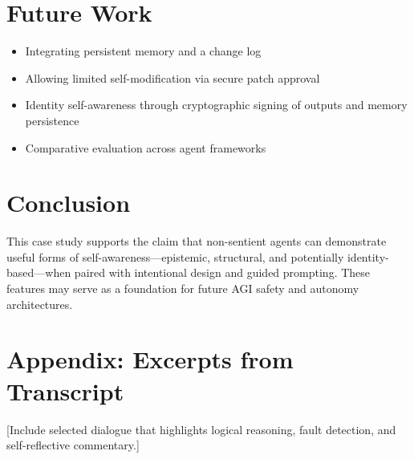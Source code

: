 \documentclass[11pt]{article}
\begin{document}
\section{Future Work}
\begin{itemize}
    \item Integrating persistent memory and a change log
    \item Allowing limited self-modification via secure patch approval
    \item Identity self-awareness through cryptographic signing of outputs and memory persistence
    \item Comparative evaluation across agent frameworks
\end{itemize}

\section{Conclusion}
This case study supports the claim that non-sentient agents can demonstrate useful forms of self-awareness---epistemic, structural, and potentially identity-based---when paired with intentional design and guided prompting. These features may serve as a foundation for future AGI safety and autonomy architectures.

\section*{Appendix: Excerpts from Transcript}
[Include selected dialogue that highlights logical reasoning, fault detection, and self-reflective commentary.]



\end{document}
